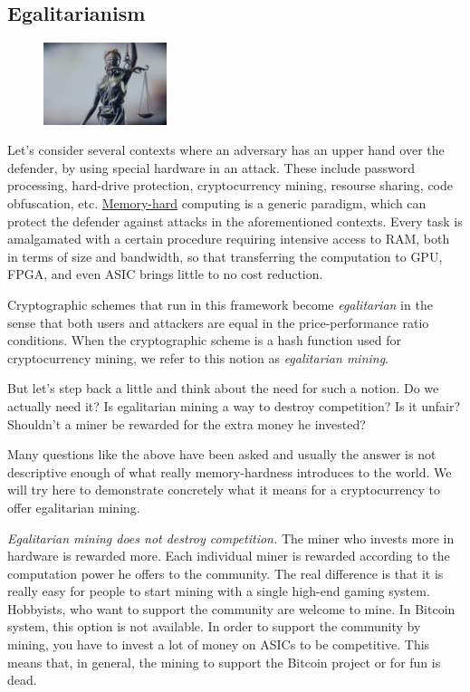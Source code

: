 \subsection{Egalitarianism} \label{sec:egalitarian}
\setlength{\intextsep}{0pt}
\begin{figure}
\centering
\includegraphics[width=0.32\textwidth]{Images/Mining/justice.jpg}
\end{figure}
Let's consider several contexts where an adversary has an upper hand over the defender, by using special hardware in an attack. These include password processing, hard-drive protection, cryptocurrency mining, resourse sharing, code obfuscation, etc. \hyperref[sec:memory-hard]{Memory-hard} computing is a generic paradigm, which can protect the defender against attacks in the aforementioned contexts. Every task is amalgamated with a certain procedure requiring intensive access to RAM, both in terms of size and bandwidth, so that transferring the computation to GPU, FPGA, and even ASIC brings little to no cost reduction.

Cryptographic schemes that run in this framework become \emph{egalitarian} in the sense that both users and attackers are equal in the price-performance ratio conditions. When the cryptographic scheme is a hash function used for cryptocurrency mining, we refer to this notion as \emph{egalitarian mining}.

But let's step back a little and think about the need for such a notion. Do we actually need it? Is egalitarian mining a way to destroy competition? Is it unfair? Shouldn't a miner be rewarded for the extra money he invested?

Many questions like the above have been asked and usually the answer is not descriptive enough of what really memory-hardness introduces to the world. We will try here to demonstrate concretely what it means for a cryptocurrency to offer egalitarian mining.

\emph{Egalitarian mining does not destroy competition.} The miner who invests more in hardware is rewarded more. Each individual miner is rewarded according to the computation power he offers to the community. The real difference is that it is really easy for people to start mining with a single high-end gaming system. Hobbyists, who want to support the community are welcome to mine. In Bitcoin system, this option is not available. In order to support the community by mining, you have to invest a lot of money on ASICs to be competitive. This means that, in general, the mining to support the Bitcoin project or for fun is dead.

